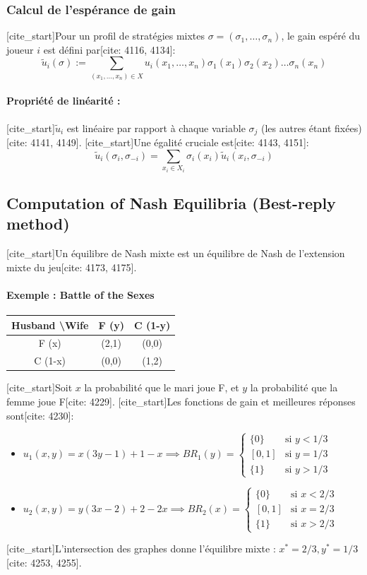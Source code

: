 \subsubsection{Calcul de l'espérance de gain}
[cite_start]Pour un profil de stratégies mixtes $\sigma = (\sigma_1, \dots, \sigma_n)$, le gain espéré du joueur $i$ est défini par[cite: 4116, 4134]:
$$\tilde{u}_i(\sigma) := \sum_{(x_1, \dots, x_n) \in X} u_i(x_1, \dots, x_n) \sigma_1(x_1) \sigma_2(x_2) \dots \sigma_n(x_n)$$

\paragraph{Propriété de linéarité :}
[cite_start]$\tilde{u}_i$ est linéaire par rapport à chaque variable $\sigma_j$ (les autres étant fixées)[cite: 4141, 4149]. [cite_start]Une égalité cruciale est[cite: 4143, 4151]:
$$\tilde{u}_i(\sigma_i, \sigma_{-i}) = \sum_{x_i \in X_i} \sigma_i(x_i) \tilde{u}_i(x_i, \sigma_{-i})$$

\subsection{Computation of Nash Equilibria (Best-reply method)}

[cite_start]Un équilibre de Nash mixte est un équilibre de Nash de l'extension mixte du jeu[cite: 4173, 4175].

\paragraph{Exemple : Battle of the Sexes}
\begin{center}
\begin{tabular}{c|c|c}
Husband \textbackslash Wife & F (y) & C (1-y) \\ \hline
F (x) & (2,1) & (0,0) \\ \hline
C (1-x) & (0,0) & (1,2)
\end{tabular}
\end{center}

[cite_start]Soit $x$ la probabilité que le mari joue F, et $y$ la probabilité que la femme joue F[cite: 4229]. [cite_start]Les fonctions de gain et meilleures réponses sont[cite: 4230]:
\begin{itemize}
    \item $u_1(x,y) = x(3y-1) + 1-x \implies BR_1(y) = 
    \begin{cases} 
    \{0\} & \text{si } y < 1/3 \\
    [0,1] & \text{si } y = 1/3 \\
    \{1\} & \text{si } y > 1/3
    \end{cases}$
    \item $u_2(x,y) = y(3x-2) + 2-2x \implies BR_2(x) = 
    \begin{cases} 
    \{0\} & \text{si } x < 2/3 \\
    [0,1] & \text{si } x = 2/3 \\
    \{1\} & \text{si } x > 2/3
    \end{cases}$
\end{itemize}
[cite_start]L'intersection des graphes donne l'équilibre mixte : $x^* = 2/3, y^* = 1/3$[cite: 4253, 4255].

